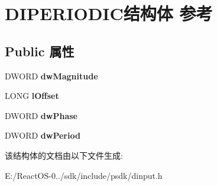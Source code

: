 \hypertarget{struct_d_i_p_e_r_i_o_d_i_c}{}\section{D\+I\+P\+E\+R\+I\+O\+D\+I\+C结构体 参考}
\label{struct_d_i_p_e_r_i_o_d_i_c}
\subsection*{Public 属性}
\begin{DoxyCompactItemize}
\item 
\mbox{\label{struct_d_i_p_e_r_i_o_d_i_c_a7983538041ff12f62cfa55c3c9d9b48f}} 
D\+W\+O\+RD {\bfseries dw\+Magnitude}
\item 
\mbox{\label{struct_d_i_p_e_r_i_o_d_i_c_a5aa8b72b52f798f0ad20a8ca6453f42f}} 
L\+O\+NG {\bfseries l\+Offset}
\item 
\mbox{\label{struct_d_i_p_e_r_i_o_d_i_c_aa186cb86456c371da401b045e0ece6eb}} 
D\+W\+O\+RD {\bfseries dw\+Phase}
\item 
\mbox{\label{struct_d_i_p_e_r_i_o_d_i_c_a00905481e88554ee2f600c26f4cdee05}} 
D\+W\+O\+RD {\bfseries dw\+Period}
\end{DoxyCompactItemize}


该结构体的文档由以下文件生成\+:\begin{DoxyCompactItemize}
\item 
E\+:/\+React\+O\+S-\/0../sdk/include/psdk/dinput.\+h\end{DoxyCompactItemize}
